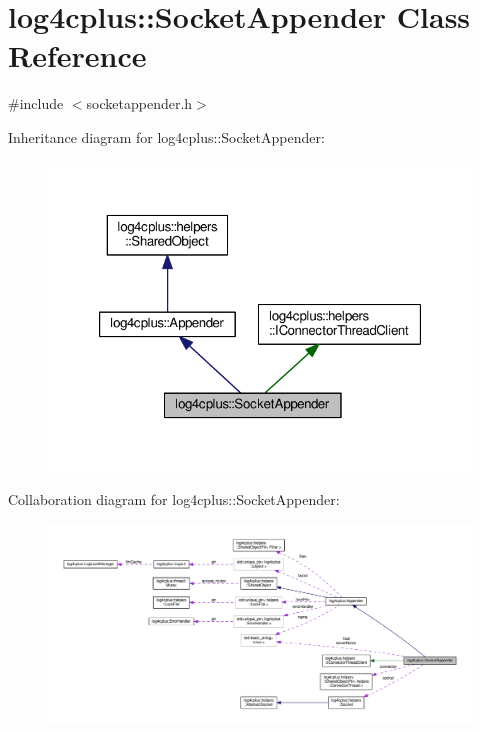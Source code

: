 \hypertarget{classlog4cplus_1_1SocketAppender}{\section{log4cplus\-:\-:Socket\-Appender Class Reference}
\label{classlog4cplus_1_1SocketAppender}
}


{\ttfamily \#include $<$socketappender.\-h$>$}



Inheritance diagram for log4cplus\-:\-:Socket\-Appender\-:
\nopagebreak
\begin{figure}[H]
\begin{center}
\leavevmode
\includegraphics[width=323pt]{classlog4cplus_1_1SocketAppender__inherit__graph}
\end{center}
\end{figure}


Collaboration diagram for log4cplus\-:\-:Socket\-Appender\-:
\nopagebreak
\begin{figure}[H]
\begin{center}
\leavevmode
\includegraphics[width=350pt]{classlog4cplus_1_1SocketAppender__coll__graph}
\end{center}
\end{figure}
